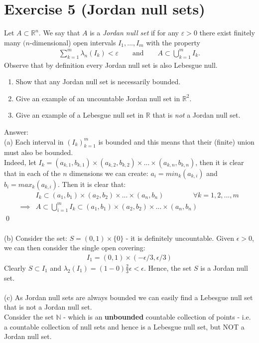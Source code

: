 \documentclass[12pt,a4paper]{article}
\begin{document}
\section*{Exercise 5 (Jordan null sets)}
Let $A\subset\mathbb{R}^n$. We say that $A$ is a \textit{Jordan null set} if for any $\varepsilon>0$ there exist finitely many $(n$-dimensional) open intervals $I_1,\ldots,I_m$ with the property
\begin{align*}
\sum_{k=1}^{m}\lambda_n(I_k)<\varepsilon
\qquad\text{and}\qquad
A\subset\bigcup_{k=1}^{m}I_k.
\end{align*}
Observe that by definition every Jordan null set is also Lebesgue null.
\begin{enumerate}[label=(\alph*)]
\item Show that any Jordan null set is necessarily bounded.
\item Give an example of an uncountable Jordan null set in $\mathbb{R}^2$.
\item Give an example of a Lebesgue null set in $\mathbb{R}$ that is \textit{not} a Jordan null set.
\end{enumerate}
Answer:\\
(a) Each interval in $(I_k)_{k=1}^m$ is bounded and this means that their (finite) union must also be bounded.\\
Indeed, let $I_k = (a_{k,1}, b_{k,1}) \times (a_{k,2}, b_{k,2}) \times ... \times (a_{k,n}, b_{k,n})$, then it is clear that in each of the
$n$ dimensions we can create: $a_i = min_k(a_{k,i})$ and $b_i = max_k(a_{k,i})$.  Then it is clear that:
\begin{align*}
 &I_k \subset (a_1, b_1) \times (a_2, b_2) \times ... \times (a_n, b_n) \;\;\;\;\;\;\;\;\;\;\;\;\;\;\; \forall k = 1,2,...,m \\
 \implies &A \subset \bigcup_{i=1}^m I_k \subset (a_1, b_1) \times (a_2, b_2) \times ... \times (a_n, b_n)
\end{align*}
\qed\\
\\
(b) Consider the set: $S = (0,1) \times \{0\}$ - it is definitely uncountable.  Given $\epsilon > 0$, we can then consider the single open covering:
\begin{align*}
   I_1 = (0,1) \times (-\epsilon/3, \epsilon/3)
\end{align*}
Clearly $S \subset I_1$ and $\lambda_2(I_1) = (1-0) \frac{2}{3}\epsilon < \epsilon$.  Hence, the set $S$ is a Jordan null set.\\
\\
(c) As Jordan null sets are always bounded we can easily find a Lebesgue null set that is not a Jordan null set.\\
Consider the set $\mathbb{N}$ - which is an \textbf{unbounded} countable collection of points - i.e. a countable collection of null sets
and hence is a Lebesgue null set, but NOT a Jordan null set.
\end{document}
